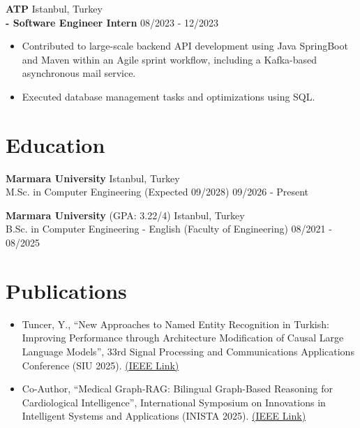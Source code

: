 \documentclass[paper=a4,fontsize=10pt]{scrartcl}
\begin{document}
\textbf{ATP} \hfill Istanbul, Turkey\\
\textbf{- Software Engineer Intern} \hfill 08/2023 - 12/2023
\begin{itemize}[noitemsep, topsep=2pt, parsep=0pt, partopsep=0pt, leftmargin=*]
    \item Contributed to large-scale backend API development using Java SpringBoot and Maven within an Agile sprint workflow, including a Kafka-based asynchronous mail service.
    \item Executed database management tasks and optimizations using SQL.
\end{itemize}

\section*{Education}
\textbf{Marmara University} \hfill Istanbul, Turkey\\
M.Sc. in Computer Engineering (Expected 09/2028) \hfill 09/2026 - Present

\textbf{Marmara University} (GPA: 3.22/4) \hfill Istanbul, Turkey\\
B.Sc. in Computer Engineering - English (Faculty of Engineering) \hfill 08/2021 - 08/2025

\section*{Publications}
\begin{itemize}[noitemsep, topsep=2pt, parsep=0pt, partopsep=0pt, leftmargin=*]
    \item Tuncer, Y., “New Approaches to Named Entity Recognition in Turkish: Improving Performance through Architecture Modification of Causal Large Language Models”, 33rd Signal Processing and Communications Applications Conference (SIU 2025). \href{https://ieeexplore.ieee.org/document/11112472}{(\underline{IEEE Link})}
    \item Co-Author, “Medical Graph-RAG: Bilingual Graph-Based Reasoning for Cardiological Intelligence”, International Symposium on Innovations in Intelligent Systems and Applications (INISTA 2025). \href{https://ieeexplore.ieee.org/document/11249583}{(\underline{IEEE Link})}
\end{itemize}
\end{document}
